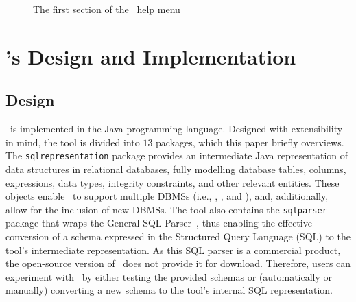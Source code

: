 
\begin{figure}

\caption{\label{fig:usage} The first section of the \sa~help menu}
\vspace*{-.1in}
\end{figure}

\section{\sa's Design and Implementation}\label{sec:implementation}
\subsection{Design}


\sa~is implemented in the Java programming language.  Designed with extensibility in mind, the tool is divided into
$13$ packages, which this paper briefly overviews. The \texttt{sqlrepresentation} package provides an intermediate Java
representation of data structures in relational databases, fully modelling database tables, columns, expressions, data
types, integrity constraints, and other relevant entities. These objects enable \sa~to support multiple DBMSs (i.e.,
\sqlite, \postgres, and \hypersql), and, additionally, allow for the inclusion of new DBMSs. The tool also contains the
\texttt{sqlparser} package that wraps the General SQL Parser~\cite{generalsqlparser}, thus enabling the effective
conversion of a schema expressed in the Structured Query Language (SQL) to the tool's intermediate representation. As
this SQL parser is a commercial product, the open-source version of \mbox{\sa}~does not provide it for download.
Therefore, users can experiment with \sa~by either testing the provided schemas or (automatically or manually)
converting a new schema to the tool's internal SQL representation.



